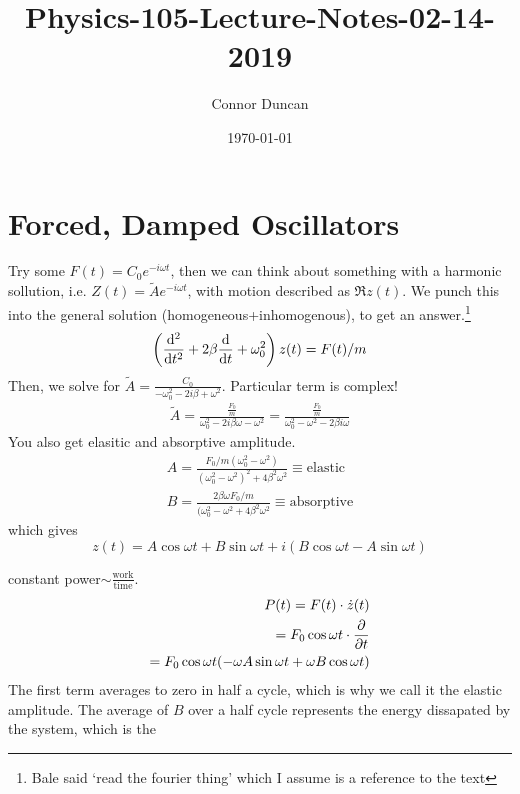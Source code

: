 \documentclass{article} \usepackage{amsmath} \usepackage{amssymb} \usepackage{amsthm} \usepackage[margin=0.2in]{geometry} \usepackage{hyperref} \usepackage{physics} \usepackage{tikz} \usepackage{mathtools} \mathtoolsset{showonlyrefs} \theoremstyle{definition} \newtheorem{theorem}{Theorem}[section] \newtheorem{corollary}{Corollary}[theorem] \newtheorem{lemma}[theorem]{Lemma} \newtheorem{definition}{Definition}[section] \author{Connor Duncan} \date{\today}
\title{Physics-105-Lecture-Notes-02-14-2019}
\begin{document}
\maketitle\tableofcontents
\noindent{}
\section{Forced, Damped Oscillators} Try some $F(t)=C_0e^{-i\omega t}$, then we can think about something with a harmonic sollution, i.e. $Z(t)=\tilde{A}e^{-i\omega t}$, with motion described as $\Re{z(t)}$. We punch this into the general solution (homogeneous+inhomogenous), to get an answer.\footnote{Bale said `read the fourier thing' which I assume is a reference to the text} \begin{align} \left(\dv[2]{}{t}+2\beta\dv{}{t}+\omega_0^2\right)z(t)=F(t)/m \end{align} Then, we solve for $\tilde{A}=\frac{C_0}{-\omega_0^2-2i\beta+\omega^2}$. Particular term is complex! \begin{align} \tilde{A}=\frac{\frac{F_0}{m}}{\omega_0^2-2i\beta\omega-\omega^2}=\frac{\frac{F_0}{m}}{\omega_0^2-\omega^2-2\beta i\omega} \end{align} You also get elasitic and absorptive amplitude. \begin{align} A=\frac{F_0/m(\omega_0^2-\omega^2)}{(\omega_0^2-\omega^2)^2+4\beta^2\omega^2}\equiv\text{elastic}\\ B=\frac{2\beta\omega F_0/m}{(\omega_0^2-\omega^2+4\beta^2\omega^2}\equiv\text{absorptive} \end{align} which gives \begin{equation} z(t)=A\cos\omega t+B\sin\omega t+i(B\cos\omega t-A\sin\omega t) \end{equation} \begin{center}  \end{center} constant power$\sim\frac{\text{work}}{\text{time}}$. \begin{align} P(t)=F(t)\cdot\dot z(t)\\ =F_0\cos\omega t\cdot\pdv{}{t}(A\cos\omega t+B\sin\omega t)\\ =F_0\cos\omega t(-\omega A\sin\omega t+\omega B\cos\omega t) \end{align} The first term averages to zero in half a cycle, which is why we call it the elastic amplitude. The average of $B$ over a half cycle represents the energy dissapated by the system, which is the 
\end{document}
